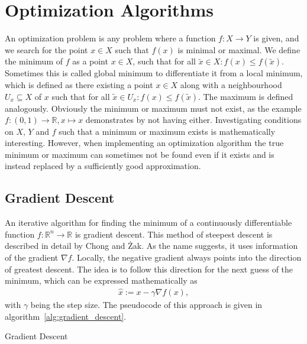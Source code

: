 \chapter{Optimization Algorithms}
\label{chapter:optimization}

An optimization problem is any problem where a function $f\colon X \rightarrow Y$ is given, and we search for the point $x \in X$ such that $f(x)$ is minimal or maximal. We define the minimum of $f$ as a point $x \in X$, such that for all $\tilde{x} \in X: f(x) \leq f(\tilde{x})$. Sometimes this is called global minimum to differentiate it from a local minimum, which is defined as there existing a point $x \in X$ along with a neighbourhood $U_x \subseteq X$ of $x$ such that for all $\tilde{x} \in U_x: f(x) \leq f(\tilde{x})$. The maximum is defined analogously. Obviously the minimum or maximum must not exist, as the example $f\colon (0, 1) \rightarrow \mathds{R}, x \mapsto x$ demonstrates by not having either. Investigating conditions on $X$, $Y$ and $f$ such that a minimum or maximum exists is mathematically interesting. However, when implementing an optimization algorithm the true minimum or maximum can sometimes not be found even if it exists and is instead replaced by a sufficiently good approximation.

\section{Gradient Descent}

An iterative algorithm for finding the minimum of a continuously differentiable function $f\colon \mathds{R}^n \rightarrow \mathds{R}$ is gradient descent. This method of steepest descent is described in detail by Chong and Żak\cite{Chong2013}. As the name suggests, it uses information of the gradient $\nabla f$. Locally, the negative gradient always points into the direction of greatest descent. The idea is to follow this direction for the next guess of the minimum, which can be expressed mathematically as
\begin{align*}
	\hat{x} := x - \gamma \nabla f(x),
\end{align*}
with $\gamma$ being the step size. The pseudocode of this approach is given in algorithm~\ref{alg:gradient_descent}.

\begin{algorithm}[H] \label{alg:gradient_descent}
	\SetAlgoLined
	\DontPrintSemicolon
	\LinesNumbered
	\caption{Gradient Descent}
	
	\BlankLine
\end{algorithm}

